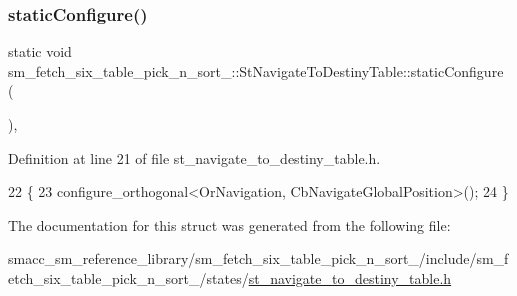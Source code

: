 \subsubsection{\texorpdfstring{static\+Configure()}{staticConfigure()}}
{\footnotesize\ttfamily static void sm\+\_\+fetch\+\_\+six\+\_\+table\+\_\+pick\+\_\+n\+\_\+sort\+\_\+::\+St\+Navigate\+To\+Destiny\+Table\+::static\+Configure (\begin{DoxyParamCaption}{ }\end{DoxyParamCaption})\hspace{0.3cm}{\ttfamily [inline]}, {\ttfamily [static]}}



Definition at line 21 of file st\+\_\+navigate\+\_\+to\+\_\+destiny\+\_\+table.\+h.


\begin{DoxyCode}
22         \{
23             configure\_orthogonal<OrNavigation, CbNavigateGlobalPosition>();
24         \}
\end{DoxyCode}


The documentation for this struct was generated from the following file\+:\begin{DoxyCompactItemize}
\item 
smacc\+\_\+sm\+\_\+reference\+\_\+library/sm\+\_\+fetch\+\_\+six\+\_\+table\+\_\+pick\+\_\+n\+\_\+sort\+\_/include/sm\+\_\+fetch\+\_\+six\+\_\+table\+\_\+pick\+\_\+n\+\_\+sort\+\_/states/\hyperlink{sm__fetch__six__table__pick__n__sort__1_2include_2sm__fetch__six__table__pick__n__sort__1_2statedbf8bb54c53551eb321853b1a1c99088}{st\+\_\+navigate\+\_\+to\+\_\+destiny\+\_\+table.\+h}\end{DoxyCompactItemize}
